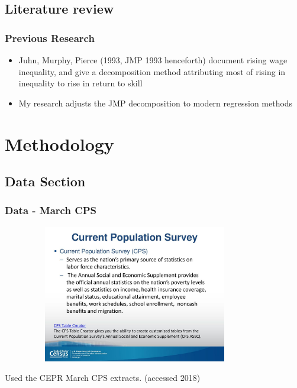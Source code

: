 \documentclass{beamer}
\begin{document}
\subsection{Literature review}
\begin{frame}
\frametitle{Previous Research}
\begin{itemize}
\pause
\item Juhn, Murphy, Pierce (1993, JMP 1993 henceforth) document rising wage inequality, and give a decomposition method attributing most of rising in inequality to rise in return to skill
\pause 
\item My research adjusts the JMP decomposition to modern regression methods
\end{itemize}
\end{frame}


\section{Methodology}

\subsection{Data Section}
\begin{frame}
\frametitle{Data - March CPS}
\pause
\begin{figure}[H]
  \centering
  \includegraphics[width=9.5cm, height=6cm]{Current+Population+Survey.jpg}
\end{figure} 
\footnotesize{Used the CEPR March CPS extracts.  (accessed 2018)}
\end{frame}

\end{document}
